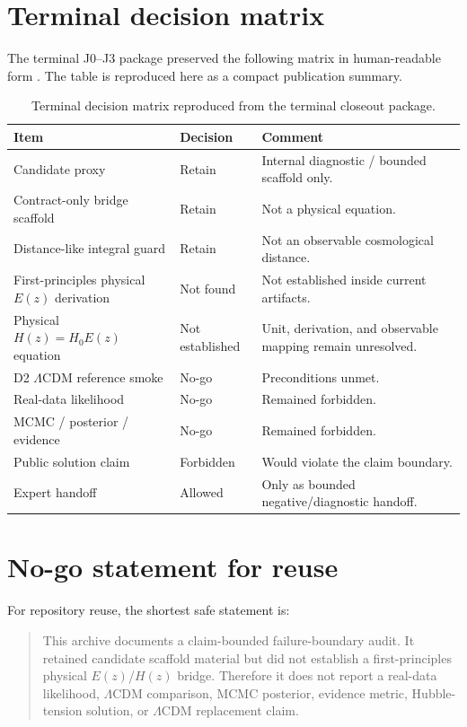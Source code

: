 \documentclass[11pt,a4paper]{article}
\newcommand{\LCDM}{$\Lambda$CDM}
\newcommand{\Ez}{$E(z)$}
\newcommand{\Hz}{$H(z)$}
\newcommand{\HzEq}{$H(z)=H_0E(z)$}
\begin{document}
\appendix
\section{Terminal decision matrix}

The terminal J0--J3 package preserved the following matrix in human-readable form \cite{J0J3Audit2026}. The table is reproduced here as a compact publication summary.

\begin{table}[H]
\centering
\small
\caption{Terminal decision matrix reproduced from the terminal closeout package.}
\begin{tabularx}{\textwidth}{p{43mm}p{24mm}Y}
\toprule
Item & Decision & Comment \\
\midrule
Candidate proxy & Retain & Internal diagnostic / bounded scaffold only. \\
Contract-only bridge scaffold & Retain & Not a physical equation. \\
Distance-like integral guard & Retain & Not an observable cosmological distance. \\
First-principles physical \Ez{} derivation & Not found & Not established inside current artifacts. \\
Physical \HzEq{} equation & Not established & Unit, derivation, and observable mapping remain unresolved. \\
D2 \LCDM{} reference smoke & No-go & Preconditions unmet. \\
Real-data likelihood & No-go & Remained forbidden. \\
MCMC / posterior / evidence & No-go & Remained forbidden. \\
Public solution claim & Forbidden & Would violate the claim boundary. \\
Expert handoff & Allowed & Only as bounded negative/diagnostic handoff. \\
\bottomrule
\end{tabularx}
\end{table}

\section{No-go statement for reuse}

For repository reuse, the shortest safe statement is:

\begin{quote}
This archive documents a claim-bounded failure-boundary audit. It retained candidate scaffold material but did not establish a first-principles physical \Ez{}/\Hz{} bridge. Therefore it does not report a real-data likelihood, \LCDM{} comparison, MCMC posterior, evidence metric, Hubble-tension solution, or \LCDM{} replacement claim.
\end{quote}
\end{document}
